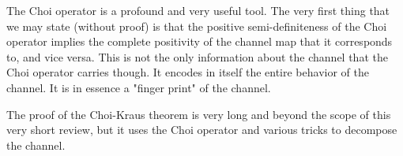 The Choi operator is a profound and very useful tool. The very first thing that we may state
(without proof) is that the positive semi-definiteness of the Choi operator implies the 
complete positivity of the channel map that it corresponds to, and vice versa. This is not
the only information about the channel that the Choi operator carries though. It encodes in
itself the entire behavior of the channel. It is in essence a "finger print" of the channel.

The proof of the Choi-Kraus theorem is very long and beyond the scope of this very short review,
but it uses the Choi operator and various tricks to decompose the channel.







